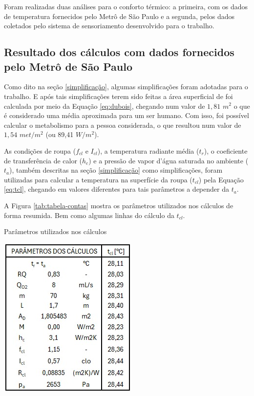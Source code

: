 \documentclass[acronym,symbols,table]{fei}
\begin{document}
Foram realizadas duas análises para o conforto térmico: a primeira, com os dados de temperatura fornecidos pelo Metrô de São Paulo e a segunda, pelos dados coletados pelo sistema de sensoriamento desenvolvido para o trabalho. 

\subsection{Resultado dos cálculos com dados fornecidos pelo Metrô de São Paulo}
Como dito na seção \ref{simplificação}, algumas simplificações foram adotadas para o trabalho. E após tais simplificações terem sido feitas a área superficial de \textcite{dubois1916formula} foi calculada por meio da Equação \ref{eq:dubois}, chegando num valor de $1,81$ $m^2$ o que é considerado uma média aproximada para um ser humano. Com isso, foi possível calcular o metabolismo para a pessoa considerada, o que resultou num valor de $1,54$ $met/m^2$ (ou 89,41 $W/m^2$).

As condições de roupa ($f_{cl}$ e $I_{cl}$), a temperatura radiante média ($t_{r}$), o coeficiente de transferência de calor ($h_{c}$) e a pressão de vapor d'água saturada no ambiente ($t_{a}$), também descritas na seção \ref{simplificação} como simplificações, foram utilizadas para calcular a temperatura na superfície da roupa ($t_{cl}$) pela Equação \ref{eq:tcl}, chegando em valores diferentes para tais parâmetros a depender da $t_{a}$. 

A Figura \ref{tab:tabela-contas} mostra os parâmetros utilizados nos cálculos de forma resumida. Bem como algumas linhas do cálculo da $t_{cl}$.

\begin{table}[!htb]
 \centering
    \caption{Parâmetros utilizados nos cálculos}
    \includegraphics[width=0.4\linewidth]{Tabelas/tabela-contas.jpeg}
    \label{tab:tabela-contas}
\end{table}
\newpage
\end{document}
